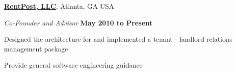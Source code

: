 \documentclass[10pt]{article}
\begin{document}
\halfblankline

\textbf{\href{http://rentpost.com/}{RentPost, LLC}},
Atlanta, GA USA
\begin{outerlist}
\item[] \textit{Co-Founder and Advisor}%
        \hfill \textbf{May 2010 to Present}%
\begin{innerlist}
\item Designed the architecture for and implemented a tenant - landlord relations management package
\item Provide general software engineering guidance
\end{innerlist}

%
%
\end{outerlist}
\end{document}
